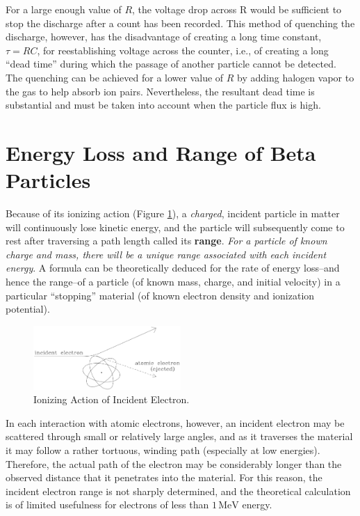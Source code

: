 For a large enough value of $R$, the voltage drop across R would be sufficient to stop the discharge after a count has been recorded. This method of quenching the discharge,
however, has the disadvantage of creating a long time constant, $\tau = RC$, for reestablishing voltage across the counter, i.e., of creating a long ``dead time'' during which the passage of another particle cannot be detected. The quenching can be achieved for a lower value of $R$ by adding halogen vapor to the gas to help absorb ion pairs. Nevertheless, the resultant dead time is substantial and must be taken into account when the particle flux is high.

\section{Energy Loss and Range of Beta Particles}
Because of its ionizing action (Figure {\ref{fig:ionizing}}), a \emph{charged}, incident particle in matter will continuously lose kinetic energy, and the particle will subsequently come to rest after traversing a path length called its \textbf{range}. \emph{For a particle of known charge and mass, there will be a unique range associated with each incident energy}. A formula can be theoretically deduced for the rate of energy loss--and hence the range--of a particle (of known mass, charge, and initial velocity) in a particular ``stopping'' material (of known electron density and ionization potential).
\begin{figure}[h]
\centering
\includegraphics[width=0.5\textwidth]{./Exp10/pic/image5.png}
\caption{Ionizing Action of Incident Electron.}
\label{fig:ionizing}
\end{figure} 

In each interaction with atomic electrons, however, an incident electron may be scattered through small or relatively large angles, and as it traverses the material it may follow a rather tortuous, winding path (especially at low energies). Therefore, the actual path of the electron may be considerably longer than the observed distance that it penetrates into the material. For this reason, the incident electron range is not sharply determined, and the theoretical calculation is of limited usefulness for electrons of less than $1\, \mathrm{MeV}$ energy.\myskip


